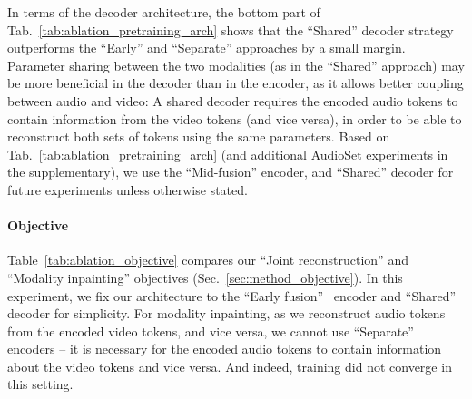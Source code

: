 \documentclass[10pt,twocolumn,letterpaper]{article}
\def \paravspace {-1\baselineskip}
\begin{document}
In terms of the decoder architecture, the bottom part of Tab.~\ref{tab:ablation_pretraining_arch} shows that the ``Shared'' decoder strategy outperforms the ``Early'' and ``Separate'' approaches by a small margin.
Parameter sharing between the two modalities (as in the ``Shared'' approach) may be more beneficial in the decoder than in the encoder, as it allows better coupling between audio and video: A shared decoder requires the encoded audio tokens to contain information from the video tokens (and vice versa), in order to be able to reconstruct both sets of tokens using the same parameters.
Based on Tab.~\ref{tab:ablation_pretraining_arch} (and additional AudioSet experiments in the supplementary), we use the ``Mid-fusion'' encoder, and ``Shared'' decoder for future experiments unless otherwise stated.



\vspace{\paravspace}
\paragraph{Objective}

\begin{table}[t]
\vspace{-0.25\baselineskip}
\caption{Ablation study of different pretraining objectives.
Models are pre-trained for 400 epochs on VGGSound with the ``Early fusion'' encoder, and ``Shared'' decoder architecture.
}
\vspace{-0.6\baselineskip}
\vspace{-1.5\baselineskip}
\label{tab:ablation_objective}
\end{table}
 


Table~\ref{tab:ablation_objective} compares our ``Joint reconstruction'' and ``Modality inpainting'' objectives (Sec.~\ref{sec:method_objective}).
In this experiment, we fix our architecture to the 
``Early fusion''  encoder and ``Shared'' decoder for simplicity. For modality inpainting, as we reconstruct audio tokens from the encoded video tokens, and vice versa, we cannot use ``Separate'' encoders -- it is necessary for the encoded audio tokens to contain information about the video tokens and vice versa.
And indeed, training did not converge in this setting. 
\end{document}
